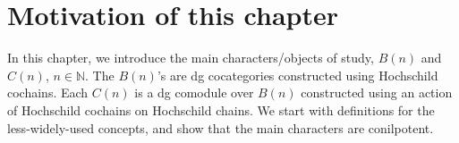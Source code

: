 \section{Motivation of this chapter}
In this chapter, we introduce the main 
characters/objects of study, $B(n)$ and 
$C(n)$, $n \in \mathbb{N}$. The $B(n)$'s are 
dg cocategories constructed using 
Hochschild cochains. Each $C(n)$ is a dg 
comodule over $B(n)$ constructed using 
an action of Hochschild cochains on 
Hochschild chains. 
We start with definitions for the 
less-widely-used concepts, and show 
that the main characters are 
conilpotent.